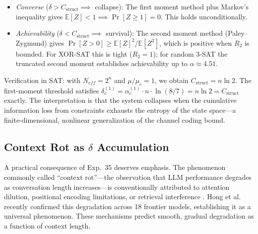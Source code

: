 \documentclass[11pt,a4paper]{article}
\begin{document}
\begin{itemize}
    \item \emph{Converse} ($\delta > C_{\text{struct}} \implies$ collapse): The first moment method plus Markov's inequality gives $\mathbb{E}[Z] < 1 \implies \Pr[Z \geq 1] = 0$. This holds unconditionally.

    \item \emph{Achievability} ($\delta < C_{\text{struct}} \implies$ survival): The second moment method (Paley--Zygmund) gives $\Pr[Z > 0] \geq \mathbb{E}[Z]^2/\mathbb{E}[Z^2]$, which is positive when $R_2$ is bounded. For XOR-SAT this is tight ($R_2 = 1$); for random 3-SAT the truncated second moment establishes achievability up to $\alpha \approx 4.51$.
\end{itemize}

\noindent Verification in SAT: with $N_{eff} = 2^n$ and $\mu/\mu_c = 1$, we obtain $C_{\text{struct}} = n \ln 2$. The first-moment threshold satisfies $\delta_c^{(1)} = \alpha_c^{(1)} \cdot n \cdot \ln(8/7) = n \ln 2 = C_{\text{struct}}$ exactly. The interpretation is that the system collapses when the cumulative information loss from constraints exhausts the entropy of the state space---a finite-dimensional, nonlinear generalization of the channel coding bound.

\subsection{Context Rot as $\delta$ Accumulation}
\label{sec:context-rot}

A practical consequence of Exp.~35 deserves emphasis. The phenomenon commonly called ``context rot''---the observation that LLM performance degrades as conversation length increases---is conventionally attributed to attention dilution, positional encoding limitations, or retrieval interference \citep{liu2024}. Hong et al.\ \citep{hong2025contextrot} recently confirmed this degradation across 18 frontier models, establishing it as a universal phenomenon. These mechanisms predict smooth, gradual degradation as a function of context length.
\end{document}
